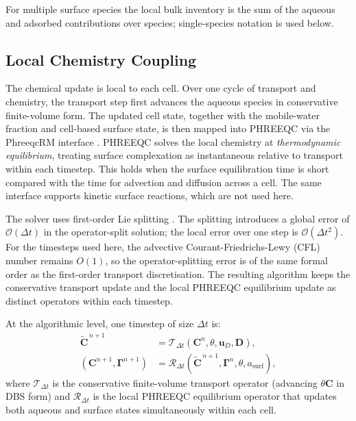 For multiple surface species the local bulk inventory is the sum of the aqueous
and adsorbed contributions over species; single-species notation is used
below.

\subsection{Local Chemistry Coupling}

The chemical update is local to each cell. Over one cycle of transport and
chemistry, the transport step first advances the aqueous species in
conservative finite-volume form. The updated cell state, together with the mobile-water
fraction and cell-based surface state, is then mapped into PHREEQC
\citep{parkhurst2013phreeqc} via the PhreeqcRM interface
\citep{parkhurst2015phreeqcrm}. PHREEQC solves the local chemistry at
\emph{thermodynamic equilibrium}, treating surface complexation as
instantaneous relative to transport within each timestep. This holds when the
surface equilibration time is short compared with the time for advection and
diffusion across a cell. The same interface supports kinetic surface reactions,
which are not used here.

The solver uses first-order Lie splitting \citep{carrayrou2004operator}. The
splitting introduces a global error of $\mathcal{O}(\Delta t)$ in the
operator-split solution; the local error over one step is
$\mathcal{O}(\Delta t^2)$. For the timesteps used here, the advective
Courant-Friedrichs-Lewy (CFL) number remains $O(1)$, so the
operator-splitting error is of the same formal order as the first-order
transport discretisation. The resulting algorithm keeps the conservative
transport update and the local PHREEQC equilibrium update as distinct
operators within each timestep.

At the algorithmic level, one timestep of size $\Delta t$ is:
\begin{align}
\widetilde{\bm{C}}^{\,n+1} &= \mathcal{T}_{\Delta t}(\bm{C}^{n}, \theta, \bm{u}_D, \bm{D}),\\
(\bm{C}^{n+1}, \bm{\Gamma}^{n+1}) &=
\mathcal{R}_{\Delta t}(\widetilde{\bm{C}}^{\,n+1}, \bm{\Gamma}^{n}, \theta, a_{\mathrm{surf}}),
\end{align}
where $\mathcal{T}_{\Delta t}$ is the conservative finite-volume transport
operator (advancing $\theta\bm{C}$ in DBS form) and $\mathcal{R}_{\Delta t}$
is the local PHREEQC equilibrium operator that updates both aqueous and
surface states simultaneously within each cell.

